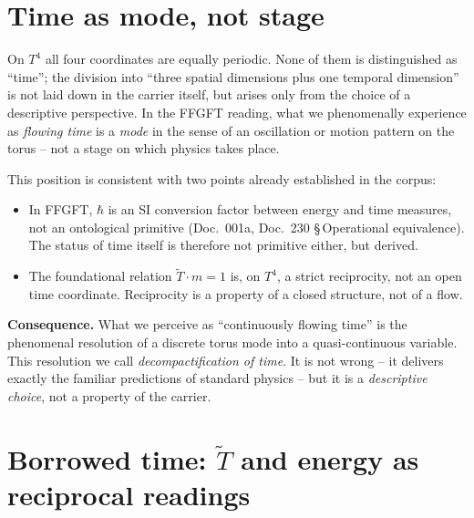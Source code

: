 \section{Time as mode, not stage}

On $T^4$ all four coordinates are equally periodic. None of them is
distinguished as ``time''; the division into ``three spatial dimensions
plus one temporal dimension'' is not laid down in the carrier itself,
but arises only from the choice of a descriptive perspective. In the
FFGFT reading, what we phenomenally experience as \emph{flowing time}
is a \emph{mode} in the sense of an oscillation or motion pattern on
the torus -- not a stage on which physics takes place.

This position is consistent with two points already established in
the corpus:

\begin{itemize}[leftmargin=2em,itemsep=4pt,topsep=4pt]
  \item In FFGFT, $\hbar$ is an SI conversion factor between energy
        and time measures, not an ontological primitive
        (Doc.~001a, Doc.~230 §\,Operational equivalence). The status
        of time itself is therefore not primitive either, but
        derived.
  \item The foundational relation $\tilde T \cdot m = 1$ is, on
        $T^4$, a strict reciprocity, not an open time coordinate.
        Reciprocity is a property of a closed structure, not of a
        flow.
\end{itemize}

\textbf{Consequence.} What we perceive as ``continuously flowing
time'' is the phenomenal resolution of a discrete torus mode into a
quasi-continuous variable. This resolution we call \emph{decompactification
of time}. It is not wrong -- it delivers exactly the familiar
predictions of standard physics -- but it is a \emph{descriptive
choice}, not a property of the carrier.

\section{Borrowed time: $\tilde T$ and energy as reciprocal readings}

